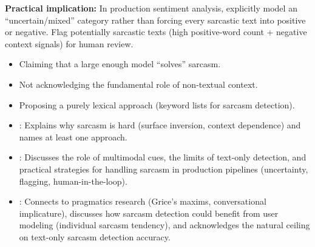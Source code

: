 \begin{interviewq}
\textbf{Practical implication:} In production sentiment analysis, explicitly model an
``uncertain/mixed'' category rather than forcing every sarcastic text into positive or
negative.  Flag potentially sarcastic texts (high positive-word count + negative context
signals) for human review.

\redflags
\begin{itemize}
    \item Claiming that a large enough model ``solves'' sarcasm.
    \item Not acknowledging the fundamental role of non-textual context.
    \item Proposing a purely lexical approach (keyword lists for sarcasm detection).
\end{itemize}


\goodgreat
\begin{itemize}
    \item {}: Explains why sarcasm is hard (surface inversion, context
    dependence) and names at least one approach.
    \item {}: Discusses the role of multimodal cues, the limits of text-only
    detection, and practical strategies for handling sarcasm in production pipelines
    (uncertainty, flagging, human-in-the-loop).
    \item {}: Connects to pragmatics research (Grice's maxims, conversational
    implicature), discusses how sarcasm detection could benefit from user modeling
    (individual sarcasm tendency), and acknowledges the natural ceiling on text-only sarcasm
    detection accuracy.
\end{itemize}

\end{interviewq}

\vspace{0.5em}

